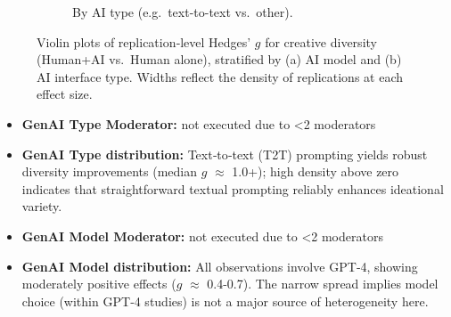 \documentclass[manuscript, screen, review, acmsmall, anonymous]{acmart}
\begin{document}
\begin{figure}[H]
\begin{subfigure}[t]{0.49\linewidth}
    \caption{By AI type (e.g.\ text-to-text vs.\ other).}
    \label{fig:diversity_raw_violin_genai_type}
  \end{subfigure}
  \caption{Violin plots of replication‐level Hedges’ $g$ for creative diversity (Human+AI vs.\ Human alone), stratified by (a) AI model and (b) AI interface type. Widths reflect the density of replications at each effect size.}
  \label{fig:diversity_raw_violins_genai}
\end{figure}
\begin{itemize}
  \item \textbf{GenAI Type Moderator:} not executed due to <2 moderators
  \item \textbf{GenAI Type distribution:} Text‑to‑text (T2T) prompting yields robust diversity improvements (median $g$ $\approx$ 1.0+); high density above zero indicates that straightforward textual prompting reliably enhances ideational variety.
  \item \textbf{GenAI Model Moderator:} not executed due to <2 moderators
  \item \textbf{GenAI Model distribution:} All observations involve GPT‑4, showing moderately positive effects ($g$ $\approx$ 0.4-0.7). The narrow spread implies model choice (within GPT‑4 studies) is not a major source of heterogeneity here.
\end{itemize}
\end{document}
